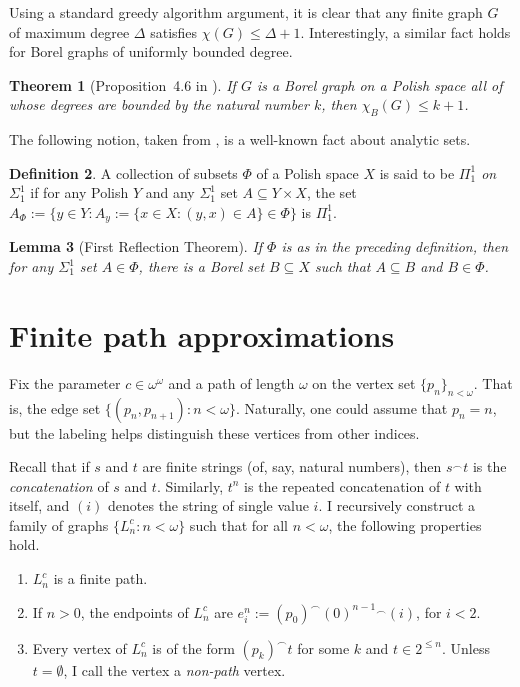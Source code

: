 \documentclass[11pt]{article}
\theoremstyle{plain}
\newtheorem{theorem}{Theorem}[section]
\newtheorem{lemma}[theorem]{Lemma}
\theoremstyle{definition}
\newtheorem{definition}[theorem]{Definition}
\theoremstyle{remark}
\begin{document}
Using a standard greedy algorithm argument, it is clear that any finite graph $G$ of maximum degree $\Delta$ satisfies $\chi(G)\leq\Delta+1$.
Interestingly, a similar fact holds for Borel graphs of uniformly bounded degree.

\begin{theorem}[Proposition~4.6 in \cite{kechris1999borel}]\label{prop:brooks}
    If $G$ is a Borel graph on a Polish space all of whose degrees are bounded by the natural number $k$, then $\chi_B(G)\leq k+1$.
\end{theorem}

The following notion, taken from \cite[Theorem~35.10, p.~285]{Kechris_1995_DescriptiveSetTheory}, is a well-known fact about analytic sets.

\begin{definition}\label{def:pi11-on-sigma11}
    A collection of subsets $\Phi$ of a Polish space $X$ is said to be \emph{$\Pi^1_1$ on $\Sigma^1_1$} if for any Polish $Y$ and any $\Sigma^1_1$ set $A\subseteq Y\times X$, the set $A_\Phi:=\{y\in Y:A_y:=\{x\in X:(y,x)\in A\}\in\Phi\}$ is $\Pi^1_1$.
\end{definition}

\begin{lemma}[First Reflection Theorem]\label{lemma:first-reflection}
    If $\Phi$ is as in the preceding definition, then for any $\Sigma^1_1$ set $A\in\Phi$, there is a Borel set $B\subseteq X$ such that $A\subseteq B$ and $B\in\Phi$.
\end{lemma}

\section{Finite path approximations}\label{sec:finite-path-approx}

Fix the parameter $c\in\omega^\omega$ and a path of length $\omega$ on the vertex set $\{p_n\}_{n<\omega}$.
That is, the edge set $\{(p_n,p_{n+1}):n<\omega\}$.
Naturally, one could assume that $p_n=n$, but the labeling helps distinguish these vertices from other indices.

Recall that if $s$ and $t$ are finite strings (of, say, natural numbers), then $s^\frown t$ is the \emph{concatenation} of $s$ and $t$.
Similarly, $t^n$ is the repeated concatenation of $t$ with itself, and $(i)$ denotes the string of single value $i$.
I recursively construct a family of graphs $\{L^c_n:n<\omega\}$ such that for all $n<\omega$, the following properties hold.

\begin{enumerate}[label=(\roman*)]
    \item $L^c_n$ is a finite path.
    \item If $n>0$, the endpoints of $L^c_n$ are $e_i^n:=(p_0)^\smallfrown(0)^{n-1}{}^\smallfrown(i)$, for $i<2$.
    \item Every vertex of $L^c_n$ is of the form $(p_k)^\smallfrown t$ for some $k$ and $t\in2^{\leq n}$. Unless $t=\emptyset$, I call the vertex a \emph{non-path} vertex.
\end{enumerate}
\end{document}
